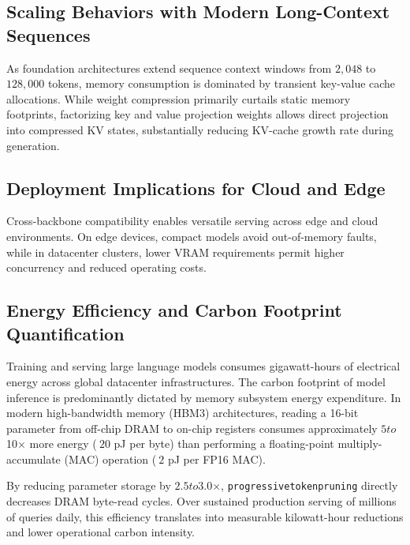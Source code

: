 \subsection{Scaling Behaviors with Modern Long-Context Sequences}
As foundation architectures extend sequence context windows from $2{,}048$ to $128{,}000$ tokens, memory consumption is dominated by transient key-value cache allocations. While weight compression primarily curtails static memory footprints, factorizing key and value projection weights allows direct projection into compressed KV states, substantially reducing KV-cache growth rate during generation.

\subsection{Deployment Implications for Cloud and Edge}
Cross-backbone compatibility enables versatile serving across edge and cloud environments. On edge devices, compact models avoid out-of-memory faults, while in datacenter clusters, lower VRAM requirements permit higher concurrency and reduced operating costs.

\subsection{Energy Efficiency and Carbon Footprint Quantification}
Training and serving large language models consumes gigawatt-hours of electrical energy across global datacenter infrastructures. The carbon footprint of model inference is predominantly dictated by memory subsystem energy expenditure. In modern high-bandwidth memory (HBM3) architectures, reading a 16-bit parameter from off-chip DRAM to on-chip registers consumes approximately $5$\times$ to $10$\times$ more energy ($~20$ pJ per byte) than performing a floating-point multiply-accumulate (MAC) operation ($~2$ pJ per FP16 MAC).

By reducing parameter storage by $2.5$\times$ to $3.0$\times$, \texttt{progressivetokenpruning} directly decreases DRAM byte-read cycles. Over sustained production serving of millions of queries daily, this efficiency translates into measurable kilowatt-hour reductions and lower operational carbon intensity.
